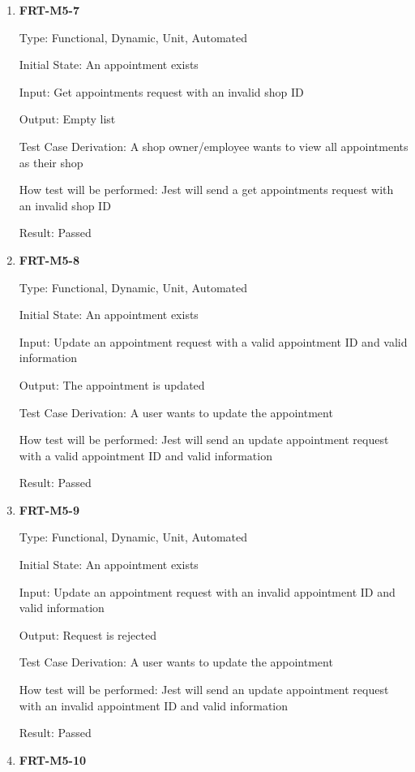 \documentclass[12pt, titlepage]{article}
\begin{document}
\begin{enumerate}
	\item \textbf{FRT-M5-7}

	      Type: Functional, Dynamic, Unit, Automated

	      Initial State: An appointment exists

	      Input: Get appointments request with an invalid shop ID

	      Output: Empty list

	      Test Case Derivation: A shop owner/employee wants to view all appointments as their shop

	      How test will be performed: Jest will send a get appointments request with an invalid shop ID

	      Result: Passed

	\item \textbf{FRT-M5-8}

	      Type: Functional, Dynamic, Unit, Automated

	      Initial State: An appointment exists

	      Input: Update an appointment request with a valid appointment ID and valid information

	      Output: The appointment is updated

	      Test Case Derivation: A user wants to update the appointment

	      How test will be performed: Jest will send an update appointment request with a valid appointment
	      ID and valid information

	      Result: Passed

	\item \textbf{FRT-M5-9}

	      Type: Functional, Dynamic, Unit, Automated

	      Initial State: An appointment exists

	      Input: Update an appointment request with an invalid appointment ID and valid information

	      Output: Request is rejected

	      Test Case Derivation: A user wants to update the appointment

	      How test will be performed: Jest will send an update appointment request with an invalid
	      appointment ID and valid information

	      Result: Passed

	\item \textbf{FRT-M5-10}


\end{enumerate}
\end{document}
